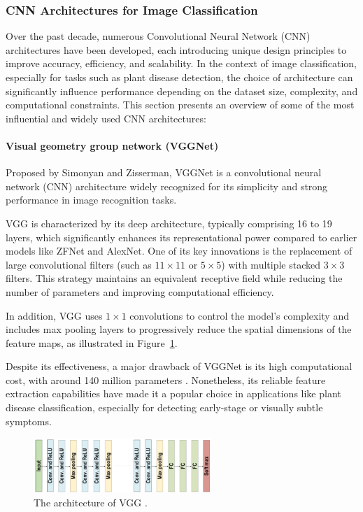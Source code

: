 \subsubsection{CNN Architectures for Image Classification}
Over the past decade, numerous Convolutional Neural Network (CNN) architectures have been developed, each introducing unique design principles to improve accuracy, efficiency, and scalability. In the context of image classification, especially for tasks such as plant disease detection, the choice of architecture can significantly influence performance depending on the dataset size, complexity, and computational constraints.
This section presents an overview of some of the most influential and widely used CNN architectures:

\paragraph{Visual geometry group network (VGGNet)}
Proposed by Simonyan and Zisserman, VGGNet is a convolutional neural network (CNN) architecture widely recognized for its simplicity and strong performance in image recognition tasks.

VGG is characterized by its deep architecture, typically comprising 16 to 19 layers, which significantly enhances its representational power compared to earlier models like ZFNet and AlexNet. One of its key innovations is the replacement of large convolutional filters (such as $11 \times 11$ or $5 \times 5$) with multiple stacked $3 \times 3$ filters. This strategy maintains an equivalent receptive field while reducing the number of parameters and improving computational efficiency.

In addition, VGG uses $1 \times 1$ convolutions to control the model’s complexity and includes max pooling layers to progressively reduce the spatial dimensions of the feature maps, as illustrated in Figure~\ref{fig:figure08}.

Despite its effectiveness, a major drawback of VGGNet is its high computational cost, with around 140 million parameters \parencite{alzubaidi2021review}. Nonetheless, its reliable feature extraction capabilities have made it a popular choice in applications like plant disease classification, especially for detecting early-stage or visually subtle symptoms.


\begin{figure}[H] %
    \centering
    \includegraphics[width=0.6\textwidth]{chapters/chapter1/images/Figure08.png}
    \caption{The architecture of VGG \parencite{alzubaidi2021review}.}
    \label{fig:figure08}
\end{figure}

